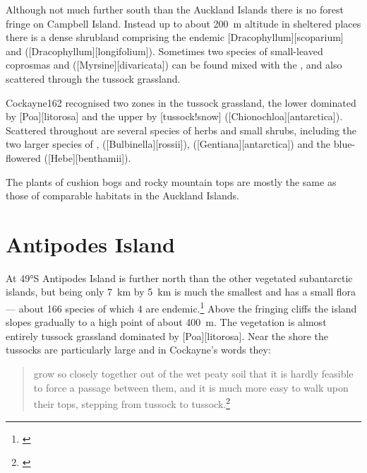 Although not much further south than the Auckland Islands there is no forest fringe on Campbell Island.
Instead up to about \SI{200}{\metre} altitude in sheltered places there is a dense shrubland comprising the endemic [Dracophyllum][scoparium] and  ([Dracophyllum][longifolium]).
Sometimes two species of small-leaved coprosmas and  ([Myrsine][divaricata]) can be found mixed with the , and also scattered through the tussock grassland.

Cockayne162 recognised two zones in the tussock grassland, the lower dominated by [Poa][litorosa] and the upper by [tussock!snow] ([Chionochloa][antarctica]).
Scattered throughout are several species of herbs and small shrubs, including the two larger species of ,  ([Bulbinella][rossii]),  ([Gentiana][antarctica]) and the blue-flowered  ([Hebe][benthamii]).

The plants of cushion bogs and rocky mountain tops are mostly the same as those of comparable habitats in the Auckland Islands.

\section{Antipodes Island}

At \ang{49}S Antipodes Island is further north than the other vegetated subantarctic islands, but being only \SI{7}{\kilo\metre} by \SI{5}{\kilo\metre} is much the smallest and has a small flora --- about 166 species of which 4 are endemic.\footnote{\cite{williams1982species}}
Above the fringing cliffs the island slopes gradually to a high point of about \SI{400}{\metre}.
The vegetation is almost entirely tussock grassland dominated by [Poa][litorosa].
Near the shore the tussocks are particularly large and in Cockayne's words they:

\begin{quote}
	grow so closely together out of the wet peaty soil that it is hardly feasible to force a passage between them, and it is much more easy to walk upon their tops, stepping from tussock to tussock.\footnote{\cite{cockayne1909ecological}}
\end{quote}

